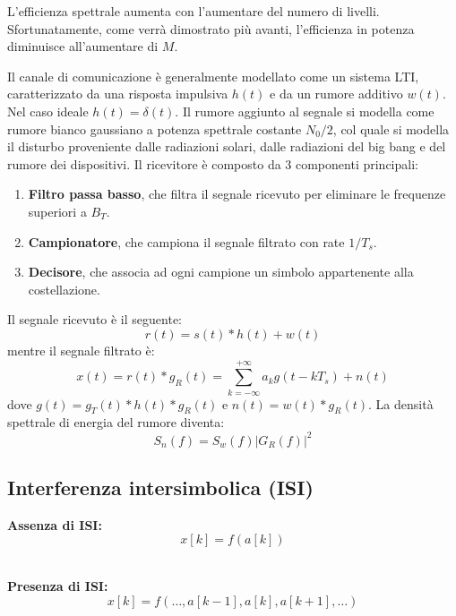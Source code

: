 L'efficienza spettrale aumenta con l'aumentare del numero di livelli. Sfortunatamente, come verrà dimostrato più avanti, l'efficienza in potenza diminuisce all'aumentare di \( M \).

\begin{center}
    
\end{center}


Il canale di comunicazione è generalmente modellato come un sistema LTI, caratterizzato da una risposta impulsiva $h(t)$ e da un rumore additivo $w(t)$.
Nel caso ideale $h(t) = \delta (t)$.
Il rumore aggiunto al segnale si modella come rumore bianco gaussiano a potenza spettrale costante $N_0/2$, col quale si modella il disturbo proveniente dalle radiazioni solari, dalle radiazioni del big bang e del rumore dei dispositivi.
Il ricevitore è composto da 3 componenti principali:
\begin{enumerate}
    \item \textbf{Filtro passa basso}, che filtra il segnale ricevuto per eliminare le frequenze superiori a $B_T$.
    \item \textbf{Campionatore}, che campiona il segnale filtrato con rate $1/T_s$.
    \item \textbf{Decisore}, che associa ad ogni campione un simbolo appartenente alla costellazione.
\end{enumerate}
Il segnale ricevuto è il seguente:
\[
    r(t) = s(t) \ast h(t) + w(t)
\]
mentre il segnale filtrato è:
\[
    x(t) = r(t) \ast g_R(t) = \sum_{k=-\infty}^{+\infty} a_k g(t - kT_s) + n(t)
\]
dove $g(t) = g_T(t) \ast h(t) \ast g_R(t)$ e $n(t) = w(t) \ast g_R(t)$. La densità spettrale di energia del rumore diventa:
\[
    S_n(f) = S_w(f) |G_R(f)|^2
\]


\subsection*{Interferenza intersimbolica (ISI)}
\noindent
\begin{minipage}{.5\textwidth}
    \centering
    \textbf{Assenza di ISI:}
    \[
        x[k] = f(a[k])
    \]
    \\
\end{minipage}%
\begin{minipage}{.5\textwidth}
    \centering
    \textbf{Presenza di ISI:}
    \[
        x[k] = f(\dots, a[k-1], a[k], a[k+1], \dots)
    \]
    \\
\end{minipage}


